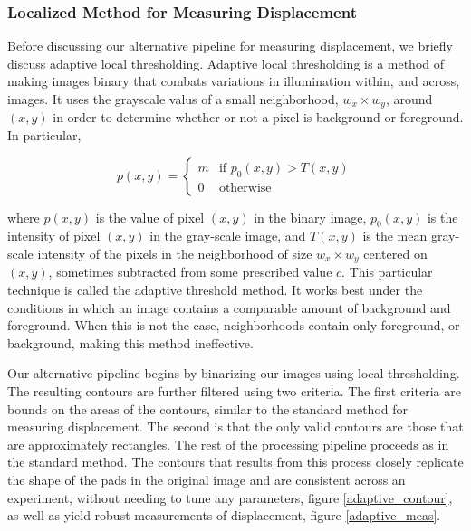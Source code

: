 \subsubsection{Localized Method for Measuring Displacement}
Before discussing our alternative pipeline for measuring displacement, we briefly discuss adaptive local thresholding. Adaptive local thresholding is a method of making images binary that combats variations in illumination within, and across, images. It uses the grayscale valus of a small neighborhood, $w_x \times w_y$, around $(x,y)$ in order to determine whether or not a pixel is background or foreground. In particular,

\begin{equation}
    p(x,y) = 
        \begin{cases}
         m      & \text{if } p_0(x,y) > T(x,y) \\
         0       &   \text{otherwise} 
         \end{cases}
\end{equation}

where $p(x,y)$ is the value of pixel $(x,y)$ in the binary image, $p_0(x,y)$ is the intensity of pixel $(x,y)$ in the gray-scale image, and $T(x,y)$ is the mean gray-scale intensity of the pixels in the neighborhood of size $w_x \times w_y$ centered on $(x,y)$, sometimes subtracted from some prescribed value $c$. This particular technique is called the adaptive threshold method. It works best under the conditions in which an image contains a comparable amount of background and foreground\cite{GW2008}. When this is not the case, neighborhoods contain only foreground, or background, making this method ineffective. 

Our alternative pipeline begins by binarizing our images using local thresholding. The resulting contours are further filtered using two criteria. The first criteria are bounds on the areas of the contours, similar to the standard method for measuring displacement. The second is that the only valid contours are those that are approximately rectangles. The rest of the processing pipeline proceeds as in the standard method. The contours that results from this process closely replicate the shape of the pads in the original image and are consistent across an experiment, without needing to tune any parameters, figure \ref{adaptive_contour}, as well as yield robust measurements of displacement, figure \ref{adaptive_meas}.

